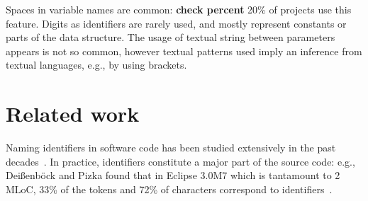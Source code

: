 \documentclass[conference]{IEEEtran}
\newcommand{\todo}[1]{ \textbf{#1} }
\begin{document}
\begin{framed}
 Spaces in variable names are common: \todo{check percent} 20\% of projects use this feature. 
 Digits as identifiers are rarely used, and mostly represent constants or parts of the data structure.
 The usage of textual string between parameters appears is not so common, however textual patterns used imply an inference from textual languages, e.g., by using brackets. 
\end{framed}

\section{Related work}
Naming identifiers in software code has been studied extensively in the past decades~\cite{AmanASK15,AnquetilL98,AvidanF17,Beniamini,ButlerWYS10,CaprileT00,HofmeisterSH17,LawrieMFB07,LunguK13,ScannielloR13,TakangGM96,Teasley,TramontanaRS14}. 
In practice, identifiers constitute a major part of the source code: e.g., Dei{\ss}enb{\"o}ck and Pizka found that in Eclipse 3.0M7 which is tantamount to 2 MLoC, 33\% of the tokens and 72\% of characters correspond to identifiers~\cite{Deissenbock}. 
\end{document}
